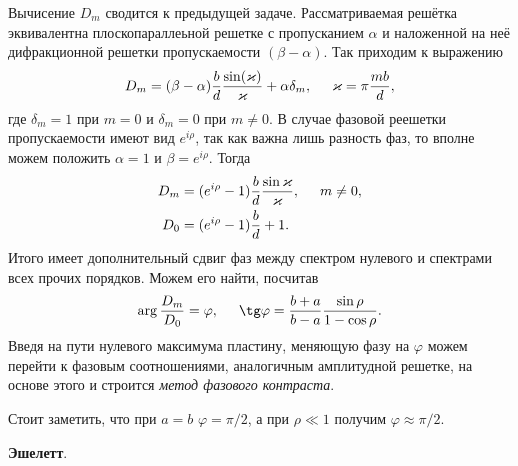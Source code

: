 Вычисение $D_m$ сводится к предыдущей задаче. Рассматриваемая решётка эквивалентна плоскопараллеьной решетке с пропусканием $\alpha$ и наложенной на неё дифракционной решетки пропускаемости $(\beta-\alpha)$. Так приходим к выражению
\begin{equation*}
    D_m = (\beta-\alpha) \frac{b}{d} \frac{\sin(\varkappa)}{\varkappa} + \alpha \delta_m, \hspace{5 mm} 
    \varkappa = \pi \frac{ m b}{d},
\end{equation*}
где $\delta_m = 1$ при $m=0$ и $\delta_m = 0$ при $m \neq 0$. В случае фазовой реешетки пропускаемости имеют вид $e^{i \rho}$, так как важна лишь разность фаз, то вполне можем положить $\alpha=1$ и $\beta=e^{i \rho}$. Тогда
\begin{align*}
    D_m &= (e^{i \rho}-1) \frac{b}{d} \frac{\sin\varkappa}{\varkappa}, \hspace{5 mm} m \neq 0, \\
    D_0 &= (e^{i \rho} -1) \frac{b}{d} + 1.
\end{align*}
Итого имеет дополнительный сдвиг фаз между спектром нулевого и спектрами всех прочих порядков. Можем его найти, посчитав
\begin{equation*}
    \arg \frac{D_m}{D_0} = \varphi, \hspace{5 mm} \tg \varphi = \frac{b+a}{b-a} \frac{\sin \rho}{1-\cos \rho}.
\end{equation*}
Введя на пути нулевого максимума пластину, меняющую фазу на $\varphi$ можем перейти к фазовым соотношениями, аналогичным амплитудной решетке, на основе этого и строится \textit{метод фазового контраста}. 

Стоит заметить, что при $a=b$ $\varphi =\pi/2$, а при $\rho \ll 1$  получим $\varphi \approx \pi/2$. 


\textbf{Эшелетт}. 


